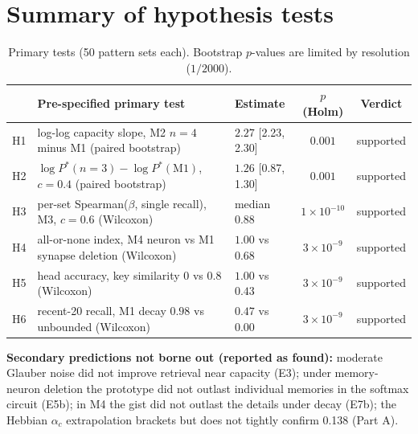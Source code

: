 \documentclass[10pt,a4paper]{article}
\begin{document}
\section{Summary of hypothesis tests}
\begin{table}[H]\centering\small
\begin{tabular}{p{0.6cm}p{7.6cm}p{4.2cm}cc}\toprule
& Pre-specified primary test & Estimate & $p$ (Holm) & Verdict\\\midrule
H1 & log-log capacity slope, M2 $n=4$ minus M1 (paired bootstrap) & $2.27$ [2.23, 2.30] & $0.001$ & supported\\
H2 & $\log P^*(n=3)-\log P^*(\mathrm{M1})$, $c=0.4$ (paired bootstrap) & $1.26$ [0.87, 1.30] & $0.001$ & supported\\
H3 & per-set Spearman($\beta$, single recall), M3, $c=0.6$ (Wilcoxon) & median $0.88$ & $1\times10^{-10}$ & supported\\
H4 & all-or-none index, M4 neuron vs M1 synapse deletion (Wilcoxon) & $1.00$ vs $0.68$ & $3\times10^{-9}$ & supported\\
H5 & head accuracy, key similarity $0$ vs $0.8$ (Wilcoxon) & $1.00$ vs $0.43$ & $3\times10^{-9}$ & supported\\
H6 & recent-20 recall, M1 decay $0.98$ vs unbounded (Wilcoxon) & $0.47$ vs $0.00$ & $3\times10^{-9}$ & supported\\\bottomrule
\end{tabular}
\caption{Primary tests (50 pattern sets each). Bootstrap $p$-values are limited by resolution ($1/2000$).}
\label{tab:primary}\end{table}
\textbf{Secondary predictions not borne out (reported as found):} moderate Glauber noise did not improve retrieval near capacity (E3);
under memory-neuron deletion the prototype did not outlast individual memories in the softmax circuit (E5b); in M4 the gist did not outlast the
details under decay (E7b); the Hebbian $\alpha_c$ extrapolation brackets but does not tightly confirm 0.138 (Part A).
\end{document}
